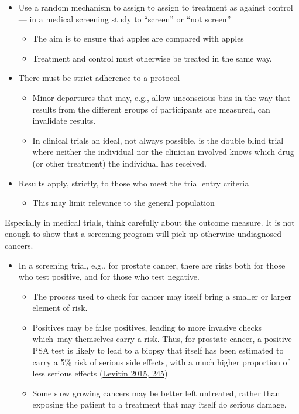 \documentclass[
  10pt,
  b5paper]{book}
\providecommand{\tightlist}{%
  \setlength{\itemsep}{0pt}\setlength{\parskip}{0pt}}
\begin{document}
\begin{itemize}
\tightlist
\item
  Use a random mechanism to assign to assign to treatment as
  against control --- in a medical screening study to
  ``screen'' or ``not screen''

  \begin{itemize}
  \tightlist
  \item
    The aim is to ensure that apples are compared with apples
  \item
    Treatment and control must otherwise be treated in the
    same way.
  \end{itemize}
\item
  There must be strict adherence to a protocol

  \begin{itemize}
  \tightlist
  \item
    Minor departures that may, e.g., allow unconscious bias
    in the way that results from the different groups of participants
    are measured, can invalidate results.
  \item
    In clinical trials an ideal, not always possible, is the double
    blind trial where neither the individual nor the clinician
    involved knows which drug (or other treatment)
    the individual has received.
  \end{itemize}
\item
  Results apply, strictly, to those who meet the trial entry criteria

  \begin{itemize}
  \tightlist
  \item
    This may limit relevance to the general population
  \end{itemize}
\end{itemize}

Especially in medical trials, think carefully about the outcome measure.
It is not enough to show that a screening program will pick up otherwise
undiagnosed cancers.

\begin{itemize}
\tightlist
\item
  In a screening trial, e.g., for prostate cancer, there are
  risks both for those who test positive, and for
  those who test negative.

  \begin{itemize}
  \tightlist
  \item
    The process used to check for cancer may itself bring
    a smaller or larger element of risk.
  \item
    Positives may be false positives, leading to more invasive
    checks which~may themselves carry a risk. Thus, for prostate
    cancer, a positive PSA test is likely to lead to a biopsy that
    itself has been estimated to carry a 5\% risk of serious side
    effects, with a much higher proportion of less serious effects
    (\protect\hyperlink{ref-levitin_2015}{Levitin 2015, 245})
  \item
    Some slow growing cancers may be better left untreated,
    rather than exposing the patient to a treatment that may itself
    do serious damage.
  \end{itemize}
\end{itemize}
\end{document}
